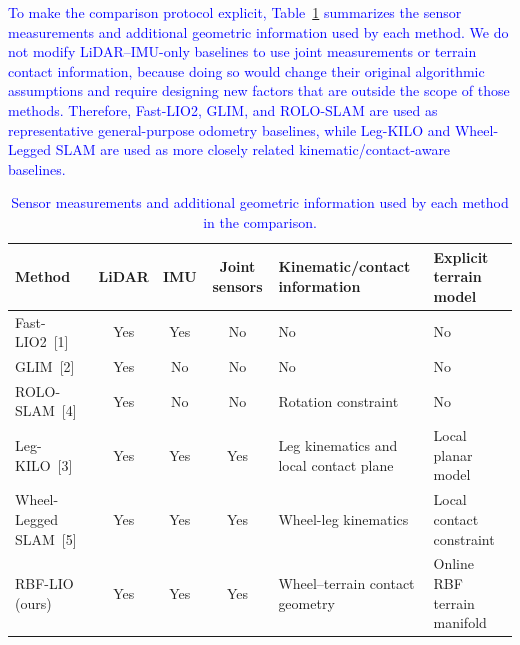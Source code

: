 \documentclass[journal,twoside,web]{ieeecolor}
\newcommand{\cs}[1]{\textcolor{blue}{#1}}
\begin{document}
\cs{To make the comparison protocol explicit, Table~\ref{tab:baseline_inputs} summarizes the sensor measurements and additional geometric information used by each method. We do not modify LiDAR--IMU-only baselines to use joint measurements or terrain contact information, because doing so would change their original algorithmic assumptions and require designing new factors that are outside the scope of those methods. Therefore, Fast-LIO2, GLIM, and ROLO-SLAM are used as representative general-purpose odometry baselines, while Leg-KILO and Wheel-Legged SLAM are used as more closely related kinematic/contact-aware baselines.}

\begin{table}[!t]
\centering
\caption{\cs{Sensor measurements and additional geometric information used by each method in the comparison.}}
\label{tab:baseline_inputs}
\small
\renewcommand{\arraystretch}{1.15}
\setlength{\tabcolsep}{5.0pt}
\begin{tabular}{|p{}|c|c|c|p{}|p{}|}
\hline
Method & LiDAR & IMU & Joint sensors & Kinematic/contact information & Explicit terrain model \\
\hline
Fast-LIO2~[1] & Yes & Yes & No & No & No \\

GLIM~[2] & Yes & No & No & No & No \\

ROLO-SLAM~[4] & Yes & No & No & Rotation constraint & No \\

Leg-KILO~[3] & Yes & Yes & Yes & Leg kinematics and local contact plane & Local planar model \\

Wheel-Legged SLAM~[5] & Yes & Yes & Yes & Wheel-leg kinematics & Local contact constraint \\

RBF-LIO (ours) & Yes & Yes & Yes & Wheel--terrain contact geometry & Online RBF terrain manifold \\
\hline
\end{tabular}
\renewcommand{\arraystretch}{1.0}
\end{table}
\end{document}

